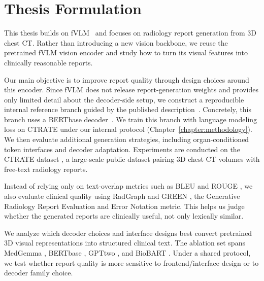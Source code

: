 \section{Thesis Formulation}
This thesis builds on fVLM~\cite{shui2025fvlm} and focuses on radiology report generation from 3D chest CT. Rather than introducing a new vision backbone, we reuse the pretrained fVLM vision encoder and study how to turn its visual features into clinically reasonable reports.

Our main objective is to improve report quality through design choices around this encoder. Since fVLM does not release report-generation weights and provides only limited detail about the decoder-side setup, we construct a reproducible internal reference branch guided by the published description~\cite{shui2025fvlm}. Concretely, this branch uses a \ac{BERTbase} decoder~\cite{devlin2019bert}. We train this branch with language modeling loss on \ac{CTRATE} under our internal protocol (Chapter~\ref{chapter:methodology}). We then evaluate additional generation strategies, including organ-conditioned token interfaces and decoder adaptation. Experiments are conducted on the \ac{CTRATE} dataset \cite{hamamci2024foundation}, a large-scale public dataset pairing 3D chest CT volumes with free-text radiology reports.

Instead of relying only on text-overlap metrics such as BLEU \cite{papineni2002bleu} and ROUGE \cite{lin2004rouge}, we also evaluate clinical quality using \ac{RadGraph} \cite{jain2021radgraph} and \ac{GREEN} \cite{ostmeier2024green}, the Generative Radiology Report Evaluation and Error Notation metric. This helps us judge whether the generated reports are clinically useful, not only lexically similar.

We analyze which decoder choices and interface designs best convert pretrained 3D visual representations into structured clinical text. The ablation set spans MedGemma \cite{yang2024medgemma}, \ac{BERTbase} \cite{devlin2019bert}, \ac{GPTtwo} \cite{radford2019language}, and BioBART \cite{yuan2022biobart}. Under a shared protocol, we test whether report quality is more sensitive to frontend/interface design or to decoder family choice.

